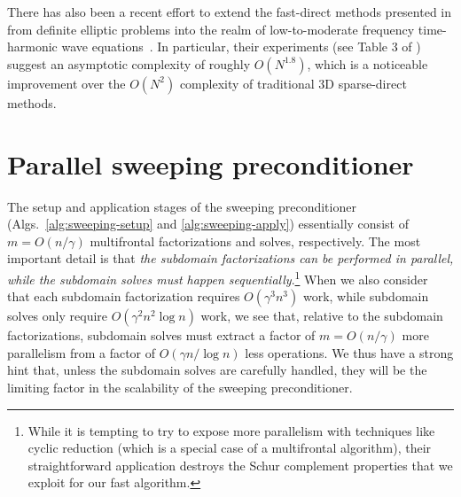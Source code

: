 There has also been a recent effort to extend the fast-direct methods presented 
in \cite{Xia-HSS} from definite elliptic problems into the realm of 
low-to-moderate frequency time-harmonic wave 
equations~\cite{Wang-geo,Wang-sisc}. 
In particular, their experiments (see Table 3 of \cite{Wang-geo}) suggest an 
asymptotic complexity of roughly $O(N^{1.8})$, which is a noticeable improvement
over the $O(N^2)$ complexity of traditional 3D sparse-direct methods.

\section{Parallel sweeping preconditioner}
\label{sec:parallel-sweeping}

The setup and application stages of the sweeping preconditioner (Algs.\ 
\ref{alg:sweeping-setup} and \ref{alg:sweeping-apply}) essentially consist of 
$m=O(n/\gamma)$ multifrontal factorizations and solves, respectively. 
The most important detail is that {\em the subdomain factorizations 
can be performed in parallel, while the subdomain solves must happen 
sequentially}.\footnote{While 
it is tempting to try to expose more parallelism with techniques like cyclic
reduction (which is a special case of a multifrontal algorithm), their
straightforward application destroys the Schur complement properties that we 
exploit for our fast algorithm.} When we also consider that each subdomain
factorization requires $O(\gamma^3 n^3)$ work, while subdomain solves only 
require $O(\gamma^2 n^2 \log n)$ work, we see that, relative to the subdomain 
factorizations, subdomain solves must extract a factor of $m=O(n/\gamma)$ more 
parallelism from a factor of $O(\gamma n/\log n)$ less operations. 
We thus have a strong hint that, unless the subdomain solves are carefully 
handled, they will be the limiting factor in the scalability of the sweeping 
preconditioner.

